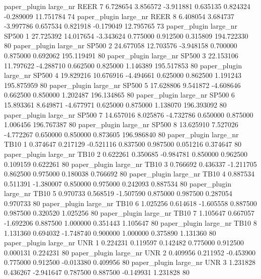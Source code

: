 paper_plugin   large_nr     REER                 7  6.728654  3.856572  -3.911881 0.635135 0.824324 -0.289009   11.751784 74
paper_plugin   large_nr     REER                 8  6.408054  3.684737  -3.997786 0.657534 0.821918 -0.179049   12.795765 73
paper_plugin   large_nr    SP500                 1 27.725392 14.017654  -3.343624 0.775000 0.912500  0.315809  194.722330 80
paper_plugin   large_nr    SP500                 2 24.677058 12.703576  -3.948158 0.700000 0.875000  0.692062  195.119491 80
paper_plugin   large_nr    SP500                 3 22.153106 11.797622  -4.288710 0.662500 0.825000  1.146389  195.517853 80
paper_plugin   large_nr    SP500                 4 19.829216 10.676916  -4.494661 0.625000 0.862500  1.191243  195.875959 80
paper_plugin   large_nr    SP500                 5 17.628806  9.541872  -4.608646 0.662500 0.850000  1.202487  196.134865 80
paper_plugin   large_nr    SP500                 6 15.893361  8.649871  -4.677971 0.625000 0.875000  1.138070  196.393092 80
paper_plugin   large_nr    SP500                 7 14.657016  8.025876  -4.732786 0.650000 0.875000  1.006456  196.767387 80
paper_plugin   large_nr    SP500                 8 13.625910  7.527026  -4.772267 0.650000 0.850000  0.873605  196.986840 80
paper_plugin   large_nr     TB10                 1  0.374647  0.217129  -0.521116 0.837500 0.987500  0.051216    0.374647 80
paper_plugin   large_nr     TB10                 2  0.622261  0.350685  -0.984781 0.850000 0.962500  0.109159    0.622261 80
paper_plugin   large_nr     TB10                 3  0.766692  0.436337  -1.211705 0.862500 0.975000  0.180038    0.766692 80
paper_plugin   large_nr     TB10                 4  0.887534  0.511391  -1.380007 0.850000 0.975000  0.242093    0.887534 80
paper_plugin   large_nr     TB10                 5  0.970733  0.568519  -1.507590 0.875000 0.987500  0.287054    0.970733 80
paper_plugin   large_nr     TB10                 6  1.025256  0.614618  -1.605558 0.887500 0.987500  0.320520    1.025256 80
paper_plugin   large_nr     TB10                 7  1.105647  0.667057  -1.692206 0.887500 1.000000  0.351443    1.105647 80
paper_plugin   large_nr     TB10                 8  1.131360  0.694032  -1.748740 0.900000 1.000000  0.375890    1.131360 80
paper_plugin   large_nr      UNR                 1  0.224231  0.119597   0.142482 0.775000 0.912500  0.000131    0.224231 80
paper_plugin   large_nr      UNR                 2  0.409956  0.211952  -0.453900 0.775000 0.912500 -0.013380    0.409956 80
paper_plugin   large_nr      UNR                 3  1.231828  0.436267  -2.941647 0.787500 0.887500 -0.149931    1.231828 80
